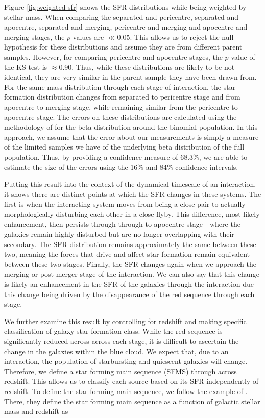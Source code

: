 Figure \ref{fig:weighted-sfr} shows the SFR distributions while being weighted by stellar mass. When comparing the separated and pericentre, separated and apocentre, separated and merging, pericentre and merging and apocentre and merging stages, the $p$-values are $\ll$0.05. This allows us to reject the null hypothesis for these distributions and assume they are from different parent samples. However, for comparing pericentre and apocentre stages, the $p$-value of the KS test is $\approx$0.90. Thus, while these distributions are likely to be not identical, they are very similar in the parent sample they have been drawn from. For the same mass distribution through each stage of interaction, the star formation distribution changes from separated to pericentre stage and from apocentre to merging stage, while remaining similar from the pericentre to apocentre stage. The errors on these distributions are calculated using the methodology of \citet{2011PASA...28..128C} for the beta distribution around the binomial population. In this approach, we assume that the error about our measurements is simply a measure of the limited samples we have of the underlying beta distribution of the full population. Thus, by providing a confidence measure of 68.3\%, we are able to estimate the size of the errors using the 16\% and 84\% confidence intervals.

Putting this result into the context of the dynamical timescale of an interaction, it shows there are distinct points at which the SFR changes in these systems. The first is when the interacting system moves from being a close pair to actually morphologically disturbing each other in a close flyby. This difference, most likely enhancement, then persists through through to apocentre stage - where the galaxies remain highly disturbed but are no longer overlapping with their secondary. The SFR distribution remains approximately the same between these two, meaning the forces that drive and affect star formation remain equivalent between these two stages. Finally, the SFR changes again when we approach the merging or post-merger stage of the interaction. We can also say that this change is likely an enhancement in the SFR of the galaxies through the interaction due this change being driven by the disappearance of the red sequence through each stage.

We further examine this result by controlling for redshift and making specific classification of galaxy star formation class. While the red sequence is significantly reduced across across each stage, it is difficult to ascertain the change in the galaxies within the blue cloud. We expect that, due to an interaction, the population of starbursting and quiescent galaxies will change. Therefore, we define a star forming main sequence (SFMS) through across redshift. This allows us to classify each source based on its SFR independently of redshift. To define the star forming main sequence, we follow the example of \citet{2019MNRAS.484.4360A}. There, they define the star forming main sequence as a function of galactic stellar mass and redshift as


